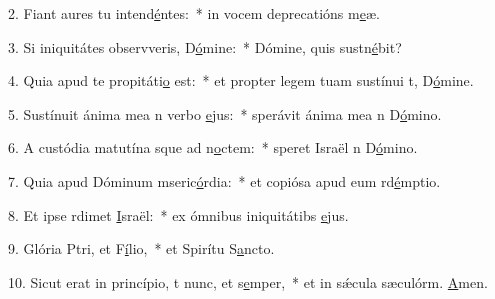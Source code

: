 2. Fiant aures tu intend\uline{é}ntes:~* in vocem deprecatións m\uline{e}æ.\par 
3. Si iniquitátes observveris, D\uline{ó}mine:~* Dómine, quis sustn\uline{é}bit?\par 
4. Quia apud te propitáti\uline{o} est:~* et propter legem tuam sustínui t, D\uline{ó}mine.\par 
5. Sustínuit ánima mea n verbo \uline{e}jus:~* sperávit ánima mea n D\uline{ó}mino.\par 
6. A custódia matutína sque ad n\uline{o}ctem:~* speret Israël n D\uline{ó}mino.\par 
7. Quia apud Dóminum mseric\uline{ó}rdia:~* et copiósa apud eum rd\uline{é}mptio.\par 
8. Et ipse rdimet \uline{I}sraël:~* ex ómnibus iniquitátibs \uline{e}jus.\par 
9. Glória Ptri, et F\uline{í}lio,~* et Spirítu S\uline{a}ncto.\par 
10. Sicut erat in princípio, t nunc, et s\uline{e}mper,~* et in sǽcula sæculórm. \uline{A}men.\par 
